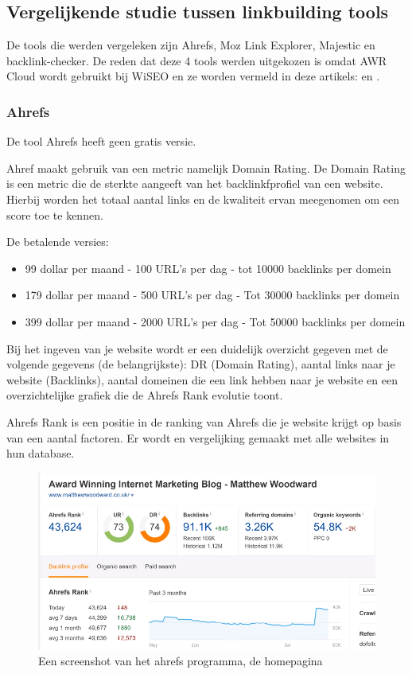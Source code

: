 \subsection{Vergelijkende studie tussen linkbuilding tools}
\label{ch: Vergelijkende studie tussen linkbuilding tools}

De tools die werden vergeleken zijn Ahrefs, Moz Link Explorer, Majestic en backlink-checker. De reden dat deze 4 tools werden uitgekozen is omdat AWR Cloud wordt gebruikt bij WiSEO en ze worden vermeld in deze artikels: \textcite{SEO13} en \textcite{SEOCOMPLETE}.  

\subsubsection{Ahrefs}
\label{ch: Ahrefs}
De tool Ahrefs heeft geen gratis versie. 

Ahref maakt gebruik van een metric namelijk Domain Rating. De Domain Rating is een metric die de sterkte aangeeft van het backlinkfprofiel van een website. Hierbij worden het totaal aantal links en de kwaliteit ervan meegenomen om een score toe te kennen. 

De betalende versies: 
\begin{itemize}
\item 99 dollar per maand - 100 URL's per dag - tot 10000 backlinks per domein
\item 179 dollar per maand - 500 URL's per dag - Tot 30000 backlinks per domein
\item 399 dollar per maand - 2000 URL's per dag - Tot 50000 backlinks per domein
\end{itemize}

Bij het ingeven van je website wordt er een duidelijk overzicht gegeven met de volgende gegevens (de belangrijkste): DR (Domain Rating), aantal links naar je website (Backlinks), aantal domeinen die een link hebben naar je website en een overzichtelijke grafiek die de Ahrefs Rank evolutie toont. 

Ahrefs Rank is een positie in de ranking van Ahrefs die je website krijgt op basis van een aantal factoren. Er wordt en vergelijking gemaakt met alle websites in hun database.

\begin{figure}[h!]
\centering
\includegraphics[width=\linewidth]{img/ahrefs.PNG}
\caption{Een screenshot van het ahrefs programma, de homepagina
\autocite{ahrefs}}
\end{figure}

